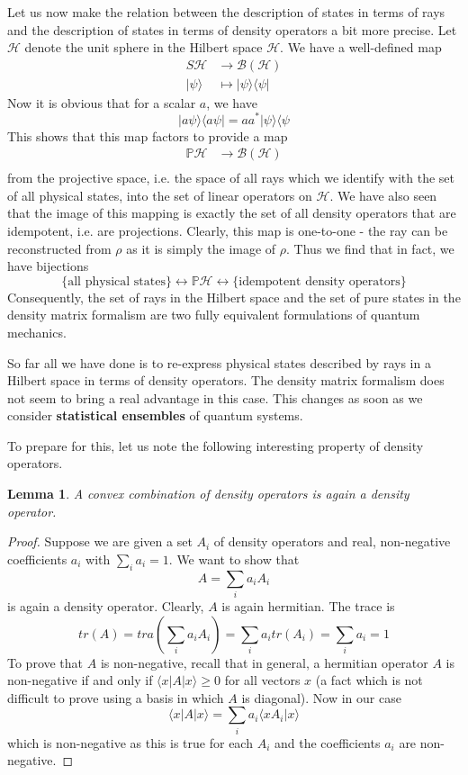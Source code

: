 \documentclass[a4paper, draft]{article}
\theoremstyle{own}
\newtheorem{lem}[thm]{Lemma}
\theoremstyle{remark}
\begin{document}
Let us now make the relation between the description of states in terms of rays and the description of states in terms of density operators a bit more precise. Let ${\mathcal H}$ denote the unit sphere in the Hilbert space $\mathcal H$. We have a well-defined map
\begin{align*}
S{\mathcal H} &\rightarrow  {\mathcal B(\mathcal H)} \\
|\psi \rangle &\mapsto  |\psi \rangle \langle \psi |
\end{align*}
Now it is obvious that for a scalar $a$, we have
$$
|a \psi \rangle \langle a \psi | = a a^* | \psi \rangle \langle  \psi
$$
This shows that this map factors to provide a map
\begin{align*}
{\mathbb P}{\mathcal H} &\rightarrow  {\mathcal B(\mathcal H)} \\
\end{align*}
from the projective space, i.e. the space of all rays which we identify with the set of all physical states, into the set of linear operators on ${\mathcal H}$. We have also seen that the image of this mapping is exactly the set of all density operators that are idempotent, i.e. are projections. Clearly, this map is one-to-one - the ray can be reconstructed from $\rho$ as it is simply the image of $\rho$. Thus we find that in fact, we have bijections
$$
\{ \text{all physical states} \} \leftrightarrow {\mathbb P}{\mathcal H}
\leftrightarrow \{ \text{idempotent density operators} \}
$$
Consequently, the set of rays in the Hilbert space and the set of pure states in the density matrix formalism are two fully equivalent formulations of quantum mechanics. 

So far all we have done is to re-express physical states described by rays in a Hilbert space in terms of density operators. The density matrix formalism does not seem to bring a real advantage in this case. This changes as soon as we consider {\bf statistical ensembles} of quantum systems. 

To prepare for this, let us note the following interesting property of density operators.

\begin{lem}
A convex combination of density operators is again a density operator.
\end{lem}

\begin{proof}
Suppose we are given a set $A_i$ of density operators and real, non-negative coefficients $a_i$ with $\sum_i a_i = 1$. We want to show that
$$
A = \sum_i a_i A_i
$$
is again a density operator. Clearly, $A$ is again hermitian. The trace is
$$
tr(A) = tra(\sum_i a_i A_i) = \sum_i a_i tr(A_i) = \sum_i a_i = 1
$$
To prove that $A$ is non-negative, recall that in general, a hermitian operator $A$ is non-negative if and only if $\langle x | A | x \rangle \geq 0$ for all vectors $x$ (a fact which is not difficult to prove using a basis in which $A$ is diagonal). Now in our case
$$
\langle x | A | x \rangle = \sum_i a_i \langle x A_i | x \rangle 
$$
which is non-negative as this is true for each $A_i$ and the coefficients $a_i$ are non-negative.
\end{proof}
\end{document}

